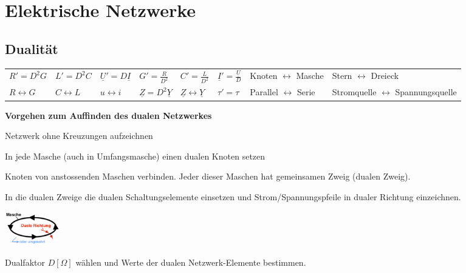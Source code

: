 \section{Elektrische Netzwerke}
\subsection{Dualität}
\begin{tabular}{llllllll}
$R'=D^2G$ & $L'=D^2C$ & $\underline{U}'=D\underline{I}$ & $G'=\frac{R}{D^2}$ &
$C'=\frac{L}{D^2}$ & $\underline{I}'=\frac{\underline{U}}{D}$ & Knoten $\leftrightarrow$
Masche & Stern $\leftrightarrow$ Dreieck \\
$R \leftrightarrow G $ & $C \leftrightarrow L$ & $u \leftrightarrow i$ & $\underline{Z} = D^2 \underline{Y}$ &
$\underline{Z} \leftrightarrow \underline{Y}$ & $\tau' = \tau$ & Parallel $\leftrightarrow$
Serie & Stromquelle $\leftrightarrow$ Spannungsquelle\\
\end{tabular}

\textbf{Vorgehen zum Auffinden des dualen Netzwerkes}
\begin{enumerate}[itemsep=1ex, nosep]
	\item Netzwerk ohne Kreuzungen aufzeichnen
	\item In jede Masche (auch in Umfangsmasche) einen dualen Knoten setzen
	\item Knoten von anstossenden Maschen verbinden. Jeder dieser Maschen hat
	gemeinsamen Zweig (dualen Zweig).\\
	\begin{minipage}{14cm}
		\item In die dualen Zweige die dualen Schaltungselemente einsetzen und Strom/Spannungspfeile in dualer Richtung einzeichnen.
	\end{minipage}
	\parbox[c]{2.5cm}{
		\includegraphics[width = 2.5cm]{./bilder/Duale_Richtung}}
	\item Dualfaktor $D [\Omega]$ wählen und Werte der dualen Netzwerk-Elemente
	bestimmen.
	
\end{enumerate}

